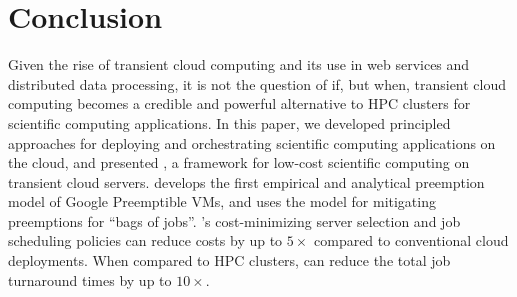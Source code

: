 
\section{Conclusion}
\label{sec:conclusion}
Given the rise of transient cloud computing and its use in web services and distributed data processing, it is not the question of if, but when, transient cloud computing becomes a credible and powerful alternative to HPC clusters for scientific computing applications. 
In this paper, we developed principled approaches for deploying and orchestrating scientific computing applications on the cloud, and presented \sysname, a framework for low-cost scientific computing on  transient cloud servers. 
\sysname develops the first empirical and analytical preemption model of Google Preemptible VMs, and uses the model for mitigating preemptions for ``bags of jobs''. 
\sysname's cost-minimizing server selection and job scheduling policies can reduce costs by up to $5\times$ compared to conventional cloud deployments.
When compared to HPC clusters, \sysname can reduce the total job turnaround times by up to $10\times$. 


